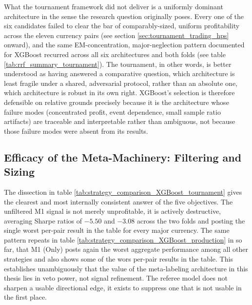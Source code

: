 \documentclass[12pt, a4paper]{article}
\begin{document}
\medskip

What the tournament framework did not deliver is a uniformly dominant architecture in the sense the research question originally poses. Every one of the six candidates 
failed to clear the bar of comparably-sized, uniform profitability across the eleven currency pairs (see section \ref{sec:tournament_trading_hps} onward), and the same EM-concentration, 
major-neglection pattern documented for XGBoost recurred across all six architectures and both folds (see table \ref{tab:rrf_summary_tournament}). The tournament, in other words, is 
better understood as having answered a comparative question, which architecture is least fragile under a shared, adversarial protocol, rather than an absolute one, which architecture 
is robust in its own right. XGBoost's selection is therefore defensible on relative grounds precisely because it is the architecture whose failure modes (concentrated profit, event 
dependence, small sample ratio artifacts) are traceable and interpretable rather than ambiguous, not because those failure modes were absent from its results.


\subsection{Efficacy of the Meta-Machinery: Filtering and Sizing}

The dissection in table \ref{tab:strategy_comparison_XGBoost_tournament} gives the clearest and most internally consistent answer of the five objectives. The unfiltered M1 signal is 
not merely unprofitable, it is actively destructive, averaging Sharpe ratios of $-5.50$ and $-3.08$ across the two folds and posting the single worst per-pair result in the table for 
every major currency. The same pattern repeats in table \ref{tab:strategy_comparison_XGBoost_production} in so far, that M1 (Only) posts again the worst aggregate performance among all 
other strategies and also shows some of the wors per-pair results in the table. This establishes unambiguously that the value of the meta-labeling architecture in this thesis lies in 
veto power, not signal refinement. The referee model does not sharpen a usable directional edge, it exists to suppress one that is not usable in the first place.

\medskip
\end{document}
